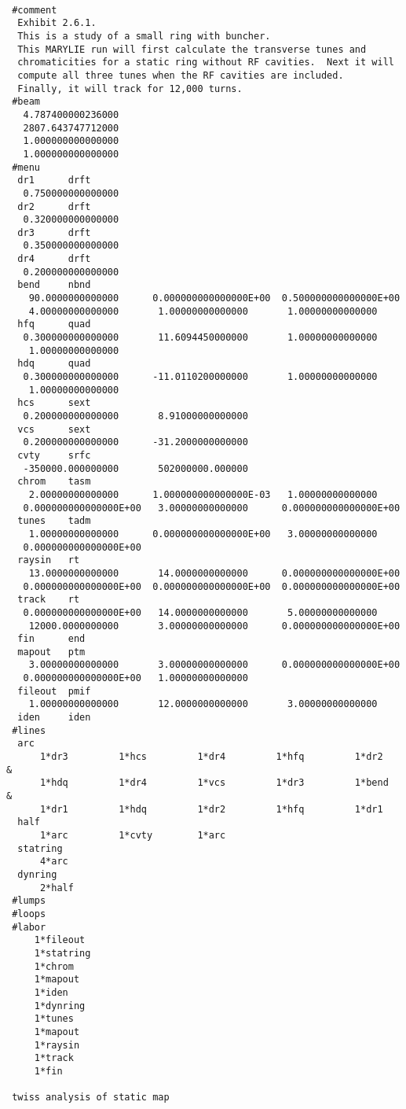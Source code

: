 {
\footnotesize\tt
\begin{verbatim}
 #comment
  Exhibit 2.6.1.
  This is a study of a small ring with buncher.
  This MARYLIE run will first calculate the transverse tunes and
  chromaticities for a static ring without RF cavities.  Next it will
  compute all three tunes when the RF cavities are included.
  Finally, it will track for 12,000 turns.
 #beam
   4.787400000236000
   2807.643747712000
   1.000000000000000
   1.000000000000000
 #menu
  dr1      drft
   0.750000000000000
  dr2      drft
   0.320000000000000
  dr3      drft
   0.350000000000000
  dr4      drft
   0.200000000000000
  bend     nbnd
    90.0000000000000      0.000000000000000E+00  0.500000000000000E+00
    4.00000000000000       1.00000000000000       1.00000000000000
  hfq      quad
   0.300000000000000       11.6094450000000       1.00000000000000
    1.00000000000000
  hdq      quad
   0.300000000000000      -11.0110200000000       1.00000000000000
    1.00000000000000
  hcs      sext
   0.200000000000000       8.91000000000000
  vcs      sext
   0.200000000000000      -31.2000000000000
  cvty     srfc
   -350000.000000000       502000000.000000
  chrom    tasm
    2.00000000000000      1.000000000000000E-03   1.00000000000000
   0.000000000000000E+00   3.00000000000000      0.000000000000000E+00
  tunes    tadm
    1.00000000000000      0.000000000000000E+00   3.00000000000000
   0.000000000000000E+00
  raysin   rt
    13.0000000000000       14.0000000000000      0.000000000000000E+00
   0.000000000000000E+00  0.000000000000000E+00  0.000000000000000E+00
  track    rt
   0.000000000000000E+00   14.0000000000000       5.00000000000000
    12000.0000000000       3.00000000000000      0.000000000000000E+00
  fin      end
  mapout   ptm
    3.00000000000000       3.00000000000000      0.000000000000000E+00
   0.000000000000000E+00   1.00000000000000
  fileout  pmif
    1.00000000000000       12.0000000000000       3.00000000000000
  iden     iden
 #lines
  arc
      1*dr3         1*hcs         1*dr4         1*hfq         1*dr2      &
      1*hdq         1*dr4         1*vcs         1*dr3         1*bend     &
      1*dr1         1*hdq         1*dr2         1*hfq         1*dr1
  half
      1*arc         1*cvty        1*arc
  statring
      4*arc
  dynring
      2*half
 #lumps
 #loops
 #labor
     1*fileout
     1*statring
     1*chrom
     1*mapout
     1*iden
     1*dynring
     1*tunes
     1*mapout
     1*raysin
     1*track
     1*fin

 twiss analysis of static map


\end{verbatim}}
